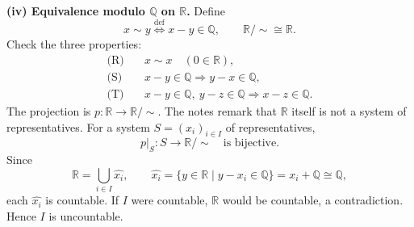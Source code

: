 \noindent\textbf{(iv) Equivalence modulo $\mathbb Q$ on $\mathbb R$.}
Define
\[
 x\sim y\overset{\mathrm{def}}\iff x-y\in\mathbb Q,
 \qquad \mathbb R/{\sim}\cong\mathbb R.
\]
Check the three properties:
\[
\begin{aligned}
\text{(R)}\quad &x\sim x\quad(0\in\mathbb R),\\
\text{(S)}\quad &x-y\in\mathbb Q\Longrightarrow y-x\in\mathbb Q,\\
\text{(T)}\quad &x-y\in\mathbb Q,\ y-z\in\mathbb Q
      \Longrightarrow x-z\in\mathbb Q.
\end{aligned}
\]
The projection is $p:\mathbb R\to\mathbb R/{\sim}$.
The notes remark that $\mathbb R$ itself is not a system of representatives.
For a system $S=(x_i)_{i\in I}$ of representatives,
\[
 p|_S:S\longrightarrow\mathbb R/{\sim}\quad\text{is bijective}.
\]
Since
\[
 \mathbb R=\bigcup_{i\in I}\widehat{x_i},\qquad
 \widehat{x_i}=\{y\in\mathbb R\mid y-x_i\in\mathbb Q\}
   =x_i+\mathbb Q\cong\mathbb Q,
\]
each $\widehat{x_i}$ is countable. If $I$ were countable,
$\mathbb R$ would be countable, a contradiction. Hence $I$ is uncountable.

\endgroup
